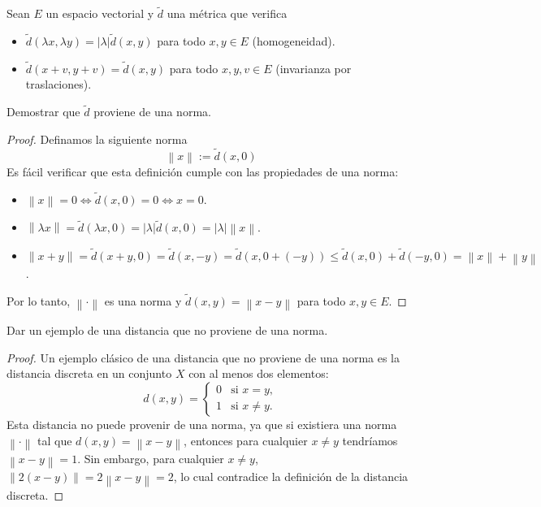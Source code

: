 \documentclass{article}
\theoremstyle{definition}
\newcommand{\norm}[1]{\left\lVert #1 \right\rVert}       %
\newenvironment{ejercicio}[1]{\begin{trivlist}
\item[\hskip \labelsep {\bfseries Ejercicio}\hskip \labelsep {\bfseries #1.}]}{\end{trivlist}}
\begin{document}
\begin{ejercicio}{2}
    Sean \(E\) un espacio vectorial y \(\tilde{d}\) una métrica que verifica
    \begin{itemize}
        \item \(\tilde{d}(\lambda x,\lambda y)=|\lambda|\tilde{d}(x,y)\) para todo \(x,y\in E\) (homogeneidad).
        \item \(\tilde{d}(x+v,y+v)=\tilde{d}(x,y)\) para todo \(x,y,v\in E\) (invarianza por traslaciones).
    \end{itemize}
    Demostrar que \(\tilde{d}\) proviene de una norma.
\end{ejercicio}
\begin{proof}
    Definamos la siguiente norma \[
        \norm{x} := \tilde{d}(x, 0)
    \]
    Es fácil verificar que esta definición cumple con las propiedades de una norma:
    \begin{itemize}
        \item \(\norm{x} = 0 \iff \tilde{d}(x, 0) = 0 \iff x = 0\).
        \item \(\norm{\lambda x} = \tilde{d}(\lambda x, 0) = |\lambda| \tilde{d}(x, 0) = |\lambda| \norm{x}\).
        \item \(\norm{x+y} = \tilde{d}(x+y, 0) = \tilde{d}(x, -y) = \tilde{d}(x, 0 + (-y)) \leq \tilde{d}(x, 0) + \tilde{d}(-y, 0) = \norm{x} + \norm{y}\).
    \end{itemize}
    Por lo tanto, \(\norm{\cdot}\) es una norma y \(\tilde{d}(x,y) = \norm{x-y}\) para todo \(x,y \in E\).
\end{proof}

\vspace{0.5cm}

\begin{ejercicio}{3}
    Dar un ejemplo de una distancia que no proviene de una norma.
\end{ejercicio}
\begin{proof}
    Un ejemplo clásico de una distancia que no proviene de una norma es la distancia discreta en un conjunto \(X\) con al menos dos elementos:
    \[
        d(x,y) = \begin{cases}
            0 & \text{si } x = y,    \\
            1 & \text{si } x \neq y.
        \end{cases}
    \]
    Esta distancia no puede provenir de una norma, ya que si existiera una norma \(\norm{\cdot}\) tal que \(d(x,y) = \norm{x-y}\), entonces para cualquier \(x \neq y\) tendríamos \(\norm{x-y} = 1\). Sin embargo, para cualquier \(x \neq y\), \(\norm{2(x-y)} = 2\norm{x-y} = 2\), lo cual contradice la definición de la distancia discreta.
\end{proof}
\end{document}
